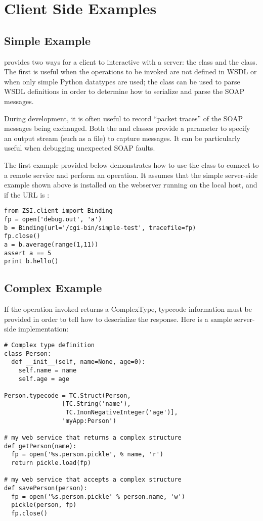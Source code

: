 \section{Client Side Examples}

\subsection{Simple Example}
\ZSI{} provides two ways for a client to interactive with a server:
the  class and the  class.
The first is useful when the operations to be invoked are not defined
in WSDL or when only simple Python datatypes are used; the 
class can be used to parse WSDL definitions in order
to determine how to serialize and parse the SOAP messages.

During development, it is often useful to record ``packet traces'' of
the SOAP messages being exchanged.
Both the  and  classes provide a
 parameter to specify an output stream (such as a file)
to capture messages.
It can be particularly useful when debugging unexpected SOAP faults.

The first example provided below demonstrates how to use the 
class to connect to a remote service and perform an operation.  It assumes
that the simple server-side example shown above is installed on the webserver 
running on the local host, and if the URL is :

\begin{verbatim}
from ZSI.client import Binding
fp = open('debug.out', 'a')
b = Binding(url='/cgi-bin/simple-test', tracefile=fp)
fp.close()
a = b.average(range(1,11))
assert a == 5
print b.hello()
\end{verbatim}

\subsection{Complex Example}
If the operation invoked returns a ComplexType, typecode information must
be provided in order to tell \ZSI{} how to deserialize the response.
Here is a sample server-side implementation:

\begin{verbatim}
# Complex type definition
class Person:
  def __init__(self, name=None, age=0):
    self.name = name
    self.age = age

Person.typecode = TC.Struct(Person,
			    [TC.String('name'),
			     TC.InonNegativeInteger('age')],
			    'myApp:Person')

# my web service that returns a complex structure
def getPerson(name):
  fp = open('%s.person.pickle', % name, 'r')
  return pickle.load(fp)

# my web service that accepts a complex structure
def savePerson(person):
  fp = open('%s.person.pickle' % person.name, 'w')
  pickle(person, fp)
  fp.close()
\end{verbatim}

